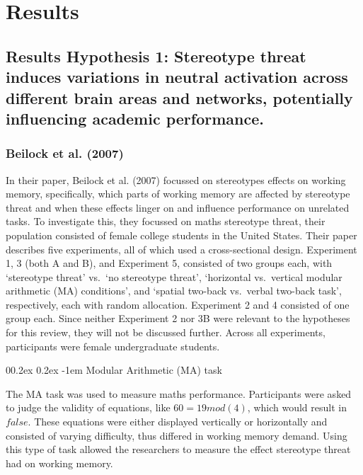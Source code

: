 \documentclass[
  stu]{apa7}
\makeatletter
\let\oldparagraph\paragraph
\renewcommand{\paragraph}[1]{\oldparagraph{#1}\mbox{}}
\renewcommand{\paragraph}{\@startsection{paragraph}{4}{\parindent}%
  {0\baselineskip \@plus 0.2ex \@minus 0.2ex}%
  {-1em}%
  {\normalfont\normalsize\bfseries\itshape\typesectitle}}
\renewcommand{\paragraph}{\@startsection{paragraph}{4}{\parindent}%
  {0\baselineskip \@plus 0.2ex \@minus 0.2ex}%
  {-1em}%
  {\normalfont\normalsize\bfseries\typesectitle}}
\makeatother
\begin{document}
\section{Results}\label{results}

\subsection{Results Hypothesis 1: Stereotype threat induces variations in neutral activation across different brain areas and networks, potentially influencing academic performance.}\label{results-hypothesis-1-stereotype-threat-induces-variations-in-neutral-activation-across-different-brain-areas-and-networks-potentially-influencing-academic-performance.}

\subsubsection{Beilock et al. (2007)}\label{beilockstereotypethreatworking2007}

In their paper, Beilock et al. (2007) focussed on stereotypes effects on working memory, specifically, which parts of working memory are affected by stereotype threat and when these effects linger on and influence performance on unrelated tasks.
To investigate this, they focussed on maths stereotype threat, their population consisted of female college students in the United States.
Their paper describes five experiments, all of which used a cross-sectional design.
Experiment 1, 3 (both A and B), and Experiment 5, consisted of two groups each, with `stereotype threat' vs.~`no stereotype threat', `horizontal vs.~vertical modular arithmetic (MA) conditions', and `spatial two-back vs.~verbal two-back task', respectively, each with random allocation.
Experiment 2 and 4 consisted of one group each.
Since neither Experiment 2 nor 3B were relevant to the hypotheses for this review, they will not be discussed further.
Across all experiments, participants were female undergraduate students.

\paragraph{Modular Arithmetic (MA) task}\label{modular-arithmetic-ma-task}

The MA task was used to measure maths performance.
Participants were asked to judge the validity of equations, like \(60 = 19 mod(4)\), which would result in \(false\).
These equations were either displayed vertically or horizontally and consisted of varying difficulty, thus differed in working memory demand.
Using this type of task allowed the researchers to measure the effect stereotype threat had on working memory.
\end{document}
